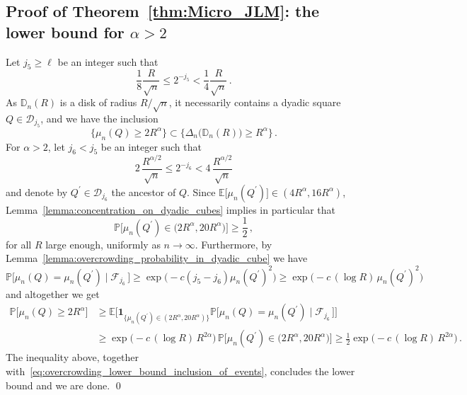 \documentclass[11pt]{amsart}
\theoremstyle{definition}
\theoremstyle{remark}
\numberwithin{equation}{section}
\newcommand{\bD}{\mathbb D}
\newcommand{\bP}{\mathbb P}
\newcommand{\bE}{\mathbb E}
\begin{document}
	\subsection{Proof of Theorem~\ref{thm:Micro_JLM}: the lower bound for \texorpdfstring{$\alpha>2$}{alpha > 2}}
	Let $j_5\ge \ell$ be an integer such that
	\[
	\frac{1}{8}\frac{R}{\sqrt{n}} \le 2^{-j_5} < \frac{1}{4}\frac{R}{\sqrt{n}}\, .
	\]
	As $\bD_n(R)$ is a disk of radius $R/\sqrt{n}$, it necessarily contains a dyadic square $Q\in \mathcal{D}_{j_5}$, and we have the inclusion
	\begin{equation}
		\label{eq:overcrowding_lower_bound_inclusion_of_events}
		\Big\{ \mu_n(Q) \ge 2R^\alpha\Big\} \subset \Big\{ \Delta_n\big(\bD_n(R)\big)\ge R^\alpha \Big\} \, .
	\end{equation} 
	For $\alpha>2$, let $j_6<j_5$ be an integer such that
	\[
	2 \, \frac{R^{\alpha/2}}{\sqrt{n}} \le 2^{-j_6} < 4 \, \frac{R^{\alpha/2}}{\sqrt{n}}
	\]
	and denote by $Q^\prime\in \mathcal{D}_{j_6}$ the ancestor of $Q$. Since $\bE\big[\mu_n(Q^\prime)\big] \in (4R^\alpha,16 R^\alpha)$, Lemma~\ref{lemma:concentration_on_dyadic_cubes} implies in particular that
	\[
	\bP\Big[\mu_n(Q^\prime) \in \big(2R^\alpha,20 R^\alpha\big) \Big] \ge \frac{1}{2} \, ,
	\]
	for all $R$ large enough, uniformly as $n\to \infty$. Furthermore, by Lemma~\ref{lemma:overcrowding_probability_in_dyadic_cube} we have
	\begin{equation*}
		\bP\Big[\mu_n(Q) = \mu_n(Q^\prime) \mid \mathcal{F}_{j_6} \, \Big] \ge \exp\Big(-c (j_5- j_6) \mu_n(Q^\prime)^2\Big) \ge \exp\Big(-c \, (\log R )\, \mu_n(Q^\prime)^2\Big) 
	\end{equation*}
	and altogether we get
	\begin{align*}
		\bP\Big[\mu_n(Q) \ge 2R^\alpha \Big] &\ge \bE\Big[\mathbf{1}_{\{\mu_n(Q^\prime) \in (2R^\alpha,20 R^\alpha)\}} \bP\big[\mu_n(Q) = \mu_n(Q^\prime)  \mid \mathcal{F}_{j_6} \, \big]\Big]  \\ &\ge \exp\Big(-c \, (\log R) \, R^{2\alpha} \Big) \, \bP\Big[\mu_n(Q^\prime) \in \big(2R^\alpha,20 R^\alpha\big)\Big]  \ge \frac{1}{2}\exp\Big(-c \, (\log R) \, R^{2\alpha} \Big) \, .
	\end{align*}
	The inequality above, together with~\eqref{eq:overcrowding_lower_bound_inclusion_of_events}, concludes the lower bound and we are done.
	\qed 
	\appendix
\end{document}
